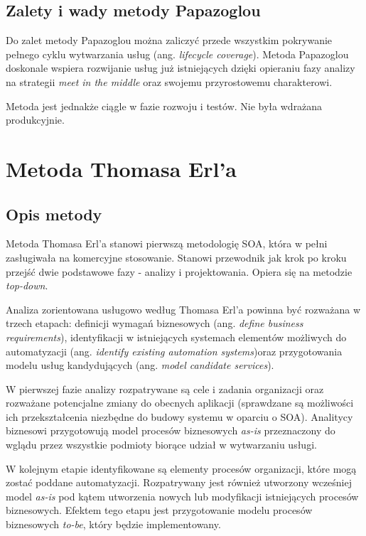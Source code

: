 \subsection{Zalety i wady metody Papazoglou}
Do zalet metody Papazoglou można zaliczyć przede wszystkim pokrywanie pełnego cyklu wytwarzania usług (ang. \emph{lifecycle coverage}). Metoda Papazoglou doskonale wspiera rozwijanie usług już istniejących dzięki opieraniu fazy analizy na strategii \emph{meet in the middle} oraz swojemu przyrostowemu charakterowi. 

Metoda jest jednakże ciągle w fazie rozwoju i testów. Nie była wdrażana produkcyjnie. \cite{RamErvSOA}


\section{Metoda Thomasa Erl'a}

\subsection{Opis metody}
Metoda Thomasa Erl'a stanowi pierwszą metodologię SOA, która w pełni zasługiwała na komercyjne stosowanie. Stanowi przewodnik jak krok po kroku przejść dwie podstawowe fazy - analizy i projektowania. Opiera się na metodzie \emph{top-down}.

Analiza zorientowana usługowo według Thomasa Erl'a powinna być rozważana w trzech etapach: definicji wymagań biznesowych (ang. \emph{define business requirements}), identyfikacji w istniejących systemach elementów możliwych do automatyzacji (ang. \emph{identify  existing 
automation systems})oraz przygotowania modelu usług kandydujących (ang. \emph{model candidate services}). 

W pierwszej fazie analizy rozpatrywane są cele i zadania organizacji oraz rozważane potencjalne zmiany do obecnych aplikacji (sprawdzane są możliwości ich przekształcenia niezbędne do budowy systemu w oparciu o SOA). Analitycy biznesowi przygotowują model procesów biznesowych \emph{as-is} przeznaczony do wglądu przez wszystkie podmioty biorące udział w wytwarzaniu usługi. 

W kolejnym etapie identyfikowane są elementy procesów organizacji, które mogą zostać poddane automatyzacji. Rozpatrywany jest również utworzony wcześniej model \emph{as-is} pod kątem utworzenia nowych lub modyfikacji istniejących procesów biznesowych. Efektem tego etapu jest przygotowanie modelu procesów biznesowych \emph{to-be}, który będzie implementowany.

